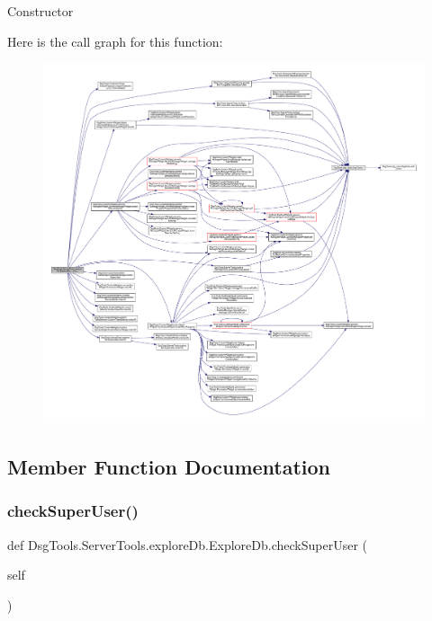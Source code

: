 \begin{DoxyVerb}Constructor
\end{DoxyVerb}
 Here is the call graph for this function\+:
\nopagebreak
\begin{figure}[H]
\begin{center}
\leavevmode
\includegraphics[width=350pt]{class_dsg_tools_1_1_server_tools_1_1explore_db_1_1_explore_db_a8093d338ae06bf10048cf67eb963190a_cgraph}
\end{center}
\end{figure}


\subsection{Member Function Documentation}
\mbox{\label{class_dsg_tools_1_1_server_tools_1_1explore_db_1_1_explore_db_ae81421cf0a3d7dff4905f2c14001643a}} 
\subsubsection{\texorpdfstring{check\+Super\+User()}{checkSuperUser()}}
{\footnotesize\ttfamily def Dsg\+Tools.\+Server\+Tools.\+explore\+Db.\+Explore\+Db.\+check\+Super\+User (\begin{DoxyParamCaption}\item[{}]{self }\end{DoxyParamCaption})}

